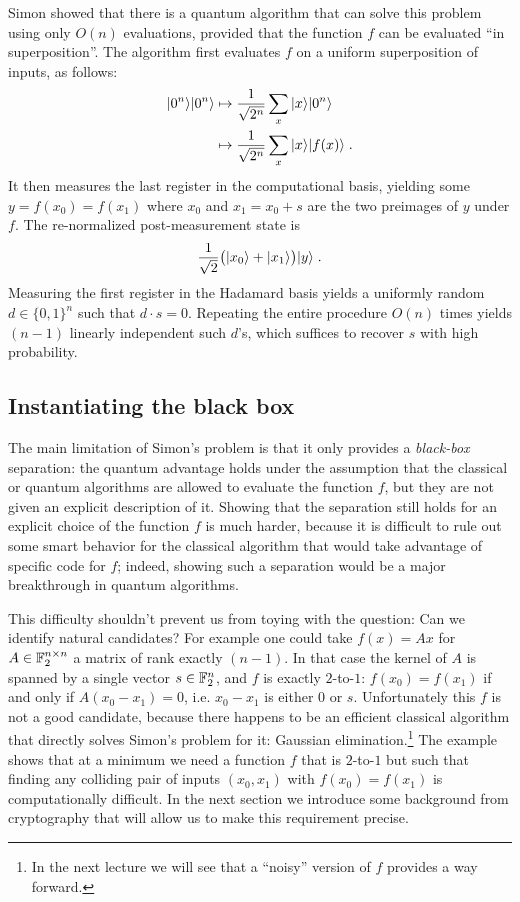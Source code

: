 Simon showed that there is a quantum algorithm that can solve this problem using only $O(n)$ evaluations, provided that the function $f$ can be evaluated ``in superposition''. The algorithm first evaluates $f$ on a uniform superposition of inputs, as follows:
\begin{align*}
|0^n\rangle|0^n\rangle & \mapsto \frac{1}{\sqrt{2^n}}\sum_x |x\rangle |0^n\rangle\notag\\
&\mapsto  \frac{1}{\sqrt{2^n}} \sum_x |x\rangle |f(x)\rangle\notag\;.
\end{align*}
It then measures the last register in the computational basis, yielding some $y=f(x_0)=f(x_1)$ where $x_0$ and $x_1 = x_0+ s$ are the two preimages of $y$ under $f$. The re-normalized post-measurement state is
\begin{equation}
 \frac{1}{\sqrt{2}}\big(|x_0\rangle + |x_1\rangle\big) |y\rangle\;. \label{eq:simon-1}
\end{equation}
Measuring the first register in the Hadamard basis yields a uniformly random $d\in\{0,1\}^n$ such that $d\cdot s = 0$. Repeating the entire procedure $O(n)$ times yields $(n-1)$ linearly independent such $d$'s, which suffices to recover $s$ with high probability. 


\subsection{Instantiating the black box}
\label{sec:simon-instantiate}

The main limitation of Simon's problem is that it only provides a \emph{black-box} separation: the quantum advantage holds under the assumption that the classical or quantum algorithms are allowed to evaluate the function $f$, but they are not given an explicit description of it. Showing that the separation still holds for an explicit choice of the function $f$ is much harder, because it is difficult to rule out some smart behavior for the classical algorithm that would take advantage of specific code for $f$; indeed, showing such a separation would be a major breakthrough in quantum algorithms. 

This difficulty shouldn't prevent us from toying with the question: Can we identify natural candidates? For example one could take $f(x) = Ax$ for $A\in \mathbb{F}_2^{n\times n}$ a matrix of rank exactly $(n-1)$. In that case the kernel of $A$ is spanned by a single vector $s\in\mathbb{F}_2^n$, and $f$ is exactly $2$-to-$1$: $f(x_0)=f(x_1)$ if and only if $A(x_0-x_1)=0$, i.e. $x_0-x_1$ is either $0$ or $s$. 
Unfortunately this $f$ is not a good candidate, because there happens to be an efficient classical algorithm that directly solves Simon's problem for it: Gaussian elimination.\footnote{In the next lecture we will see that a ``noisy'' version of $f$ provides a way forward.} The example shows that at a minimum we need a function $f$ that is $2$-to-$1$ but such that finding any colliding pair of inputs $(x_0,x_1)$ with $f(x_0)=f(x_1)$ is computationally difficult. In the next section we introduce some background from cryptography that will allow us to make this requirement precise. 

